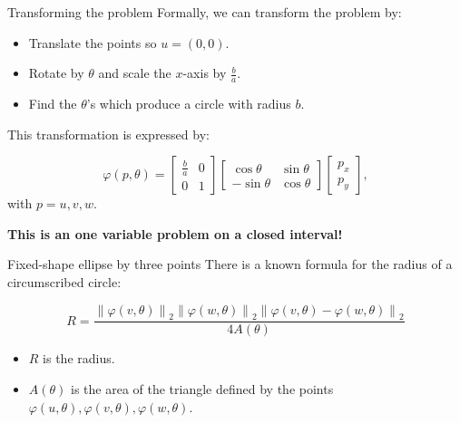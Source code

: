 \documentclass{beamer}
\newcommand{\norm}[2][2]{\left\lVert#2\right\rVert_{#1}}
\begin{document}
\begin{frame}{Transforming the problem}
	Formally, we can transform the problem by:
	
	\begin{itemize}
		\item Translate the points so $u=(0, 0)$.
		\item Rotate by $\theta$ and scale the $x$-axis by $\frac{b}{a}$.
		\item Find the $\theta$'s which produce a circle with radius $b$.
	\end{itemize}

	This transformation is expressed by:
	
	\begin{equation*}\label{eq:trpnts}
	\varphi(p, \theta)=\left[\begin{array}{cc}
	\frac{b}{a}&0\\
	0&1
	\end{array}\right]
	\left[\begin{array}{cc}
	\cos{\theta}&\sin{\theta}\\
	-\sin{\theta}&\cos{\theta}
	\end{array}\right]\left[\begin{array}{c}
	p_x\\
	p_y
	\end{array}\right],
	\end{equation*}
	with $p=u, v, w$.
	
	\textbf{This is an one variable problem on a closed interval!}

\end{frame}
	
\begin{frame}{Fixed-shape ellipse by three points}
	There is a known formula for the radius of a circumscribed circle:

	\begin{equation*}
	R = \dfrac{\norm{\varphi(v, \theta)}\norm{\varphi(w, \theta)}\norm{\varphi(v, \theta)-\varphi(w, \theta)}   }{4A(\theta)}
	\end{equation*}
	
	\begin{itemize}
		\item $R$ is the radius.
		\item $A(\theta)$ is the area of the triangle defined by the points $\varphi(u, \theta), \varphi(v, \theta), \varphi(w, \theta)$.
	\end{itemize}
	\vspace{\baselineskip}
	

												
\end{frame}
\end{document}
